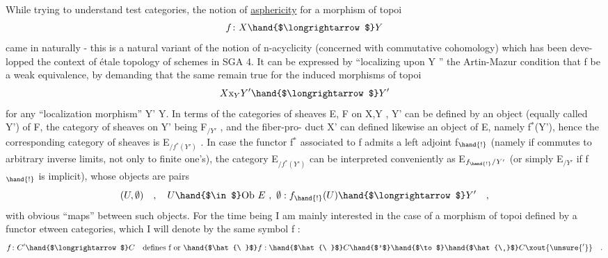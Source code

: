While trying to understand test categories, the notion of \uline{asphericity}
for a morphism of topoi
\[ f\colon X \hand{$\longrightarrow$} Y \]
came in naturally - this is a natural  variant of the notion of
n-acyclicity (concerned with commutative cohomology) which has been deve-%
lopped  the context of étale topology of schemes in SGA 4. It can be
expressed by ``localizing upon Y '' the Artin-Mazur condition that f be
a weak equivalence, by demanding that the same remain true for the induced
morphisms of topoi
\[ X\mathrm{x}_{Y}Y' \hand{$\longrightarrow$} Y' \]
for any ``localization morphism'' Y'\hand{$\longrightarrow$} Y. In terms of the categories of
sheaves  E, F on X,Y , Y' can be defined by an object (equally called
Y') of F, the category of sheaves on Y' being F$_{/Y'}$ , and the fiber-pro-%
duct X' can  defined likewise  an object  of E, namely  f$^{*}$(Y'),
hence the corresponding category of sheaves is E$_{/f^{*}(Y')}$ . In case the
functor f$^{*}$ associated to f admits a left adjoint f$_{\hand{!}}$ (namely if  commutes
to arbitrary inverse limits, not only to finite one's), the category
E$_{/f^{*}(Y')}$ can be interpreted conveniently as  E$_{f_{\hand{!}}/Y'}$ (or simply E$_{/Y'}$
if f$_{\hand{!}}$ is implicit), whose objects are pairs
\[ (U,\emptyset) \quad , \quad U \hand{$\in$} \mathrm{Ob}\ E \ , \ \emptyset : f_{\hand{!}}(U) \hand{$\longrightarrow$} Y' \quad , \]
with obvious ``maps'' between such objects. For the time being I am mainly
interested in the case of a morphism of topoi defined by a functor etween
categories, which I will denote by the same symbol \hand{$\hat{\ }$}f :
\[ f\colon C' \hand{$\longrightarrow$} C \quad \text{defines f or } \hand{$\hat{\ }$}f : \hand{$\hat{\ }$}C\hand{$'$} \hand{$\to$} \hand{$\hat{\ }$}C\xout{\unsure{'}} \quad . \]
